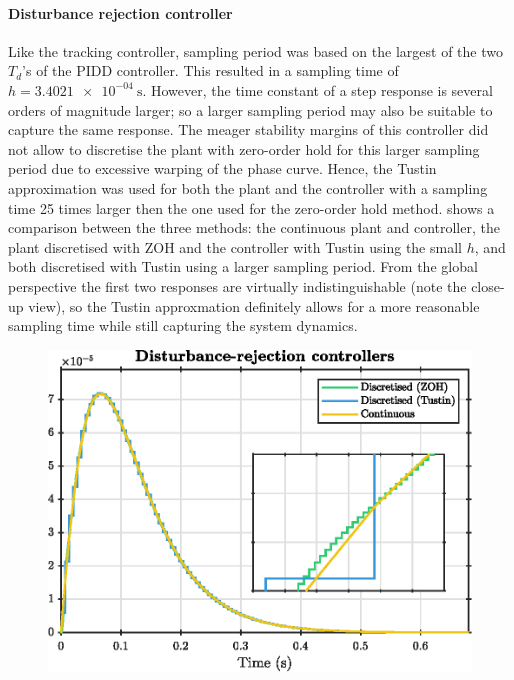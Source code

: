 \paragraph{Disturbance rejection controller}
Like the tracking controller, sampling period was based on the largest of the two $T_d$'s of the PIDD controller. This resulted in a sampling time of $h = \SI{3.4021e-04}{\second}$. However, the time constant of a step response is several orders of magnitude larger; so a larger sampling period may also be suitable to capture the same response. The meager stability margins of this controller did not allow to discretise the plant with zero-order hold for this larger sampling period due to excessive warping of the phase curve. Hence, the Tustin approximation was used for both the plant and the controller with a sampling time 25 times larger then the one used for the zero-order hold method.  shows a comparison between the three methods: the continuous plant and controller, the plant discretised with ZOH and the controller with Tustin using the small $h$, and both discretised with Tustin using a larger sampling period. From the global perspective the first two responses are virtually indistinguishable (note the close-up view), so the Tustin approxmation definitely allows for a more reasonable sampling time while still capturing the system dynamics.
\begin{figure}[ht]
    \centering
    \includegraphics[]{media/q4/dt_distrej.eps}
    \caption{}
    \label{fig:q4_dt_distrej}
\end{figure}